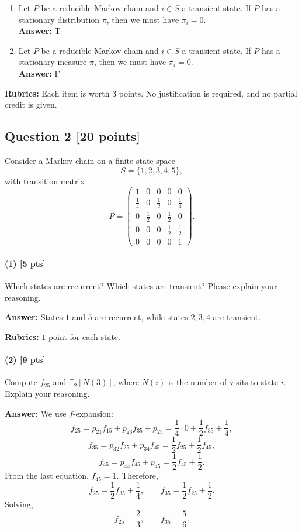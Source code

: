 \documentclass[11pt]{article}
\theoremstyle{definition}
\begin{document}
\begin{enumerate}[label=(\arabic*)]
    \item Let \(P\) be a reducible Markov chain and \(i\in S\) a transient state. If \(P\) has a stationary distribution \(\pi\), then we must have \(\pi_i=0\). \\
    \textbf{Answer:} T

    \item Let \(P\) be a reducible Markov chain and \(i\in S\) a transient state. If \(P\) has a stationary measure \(\pi\), then we must have \(\pi_i=0\). \\
    \textbf{Answer:} F
\end{enumerate}

\textbf{Rubrics:} Each item is worth \(3\) points. No justification is required, and no partial credit is given.

\subsection*{Question 2 \hfill [20 points]}

Consider a Markov chain on a finite state space
\[
S=\{1,2,3,4,5\},
\]
with transition matrix
\[
P=
\begin{pmatrix}
1 & 0 & 0 & 0 & 0\\
\frac14 & 0 & \frac12 & 0 & \frac14\\
0 & \frac12 & 0 & \frac12 & 0\\
0 & 0 & 0 & \frac12 & \frac12\\
0 & 0 & 0 & 0 & 1
\end{pmatrix}.
\]

\paragraph{(1) \hfill [5 pts]}
Which states are recurrent? Which states are transient? Please explain your reasoning.

\textbf{Answer:} States \(1\) and \(5\) are recurrent, while states \(2,3,4\) are transient.

\textbf{Rubrics:} \(1\) point for each state.

\paragraph{(2) \hfill [9 pts]}
Compute \(f_{25}\) and \(\mathbb E_2[N(3)]\), where \(N(i)\) is the number of visits to state \(i\). Explain your reasoning.

\textbf{Answer:}
We use \(f\)-expansion:
\[
f_{25}=p_{21}f_{15}+p_{23}f_{35}+p_{25}
=\frac14\cdot 0+\frac12 f_{35}+\frac14,
\]
\[
f_{35}=p_{32}f_{25}+p_{34}f_{45}
=\frac12 f_{25}+\frac12 f_{45},
\]
\[
f_{45}=p_{44}f_{45}+p_{45}
=\frac12 f_{45}+\frac12.
\]
From the last equation, \(f_{45}=1\). Therefore,
\[
f_{25}=\frac12 f_{35}+\frac14,
\qquad
f_{35}=\frac12 f_{25}+\frac12.
\]
Solving,
\[
f_{25}=\frac23,
\qquad
f_{35}=\frac56.
\]
\end{document}
